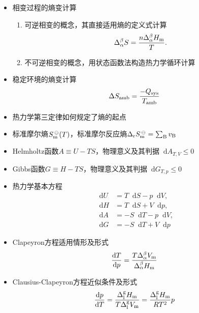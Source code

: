 \documentclass[9pt]{beamer}
\newcommand\B{{\rm B}}
\newcommand\amb{{\rm amb}}
\newcommand*{\dif}{\mathop{}\!\mathrm{d}}
\newcommand\m{{\rm m}}
\newcommand\rr{{\rm r}}
\begin{document}
	\begin{frame}
	
	\begin{itemize}
	
	\item 相变过程的熵变计算
		\begin{enumerate}
	
		\item 可逆相变的概念，其直接适用熵的定义式计算
		\[
			\Delta^\beta_\alpha S = \frac{ n \Delta^\beta_\alpha H_\m}{T}.
		\]
	
		\item 不可逆相变的概念，用状态函数法构造热力学循环计算
	
	\end{enumerate}
	
	\item 稳定环境的熵变计算
		\[
			\Delta S_\amb = \frac{ -Q_{\rm sys} }{T_\amb}
		\]
	
	\item 热力学第三定律如何规定了熵的起点
	
	\item 标准摩尔熵$S^{\,\ominus}_\m(T)$，标准摩尔反应熵$\Delta_\rr S^{\,\ominus}_\m = \sum_\B v_\B $
	
	\item Helmholtz函数$A\equiv U-TS$，物理意义及其判据$\dif A_{T,V} \leq 0$
	
	\item Gibbs函数$G\equiv H-TS$，物理意义及其判据$\dif G_{T,p} \leq 0$
	
	\item 热力学基本方程
	\begin{align*}
		\dif U &= T \dif S - p \dif V , \\
		\dif H &= T \dif S + V \dif p , \\
		\dif A &= - S \dif T - p \dif V , \\
		\dif G &= - S \dif T + V \dif p
	\end{align*}		
	
	\end{itemize}		
	
	\end{frame}
	
	\begin{frame}
	
	\begin{itemize}
	
	\item Clapeyron方程适用情形及形式
	\[
		\frac{\dif T}{\dif p} = \frac{ T \Delta^\beta_\alpha V_\m }{ \Delta^\beta_\alpha H_\m }
	\]	
	
	\item Clausius-Clapeyron方程近似条件及形式
	\[
		\frac{\dif p}{\dif T} = \frac{ \Delta^{\rm g}_{\rm l} H_\m }{ T \Delta^{\rm g}_{\rm l} V_\m } = \frac{ \Delta^{\rm g}_{\rm l} H_\m }{ R T^2 }p
	\]
	
	\end{itemize}	
	
	\end{frame}
	
\end{document}
